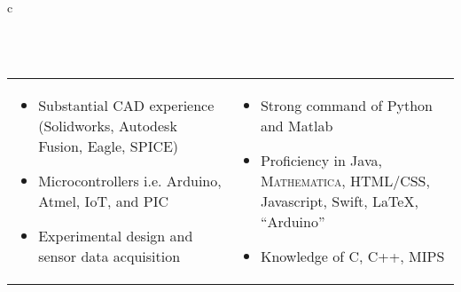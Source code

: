 \documentclass[11pt]{amsart}
\newcommand*\ruleline[1]{\par\noindent\raisebox{.8ex}{\makebox[\linewidth]{\hrulefill\hspace{1ex}\raisebox{-.8ex}{\Large~#1~}\hspace{1ex}\hrulefill}}\\ \-\ \vspace{-1em}}
\begin{document}
\begin{center}
\begin{tabular}{c}
	\ruleline{Skills}
	\begin{minipage}{\textwidth}
	\vspace{-1em}
	\begin{tabular}{p{}p{\dimexpr .5\textwidth-2\tabcolsep}}
			\begin{itemize}[leftmargin=*]
				\item Substantial CAD experience \linebreak(Solidworks, Autodesk Fusion, Eagle, SPICE)
				\item Microcontrollers i.e. Arduino, Atmel, IoT, and PIC
				\item Experimental design and sensor data acquisition
			\end{itemize}
		&
			\begin{itemize}[leftmargin=*]
				\item Strong command of Python and Matlab
				\item Proficiency in Java, \textsc{Mathematica}, HTML/CSS, Javascript, Swift, \LaTeX, ``Arduino''
				\item Knowledge of C, C++, MIPS
			\end{itemize}
	\end{tabular}
	\end{minipage}\\~ \vspace{-2em}\\
	

\end{tabular}
\end{center}
\end{document}
